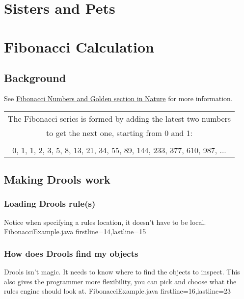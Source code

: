\chapter{Sisters and Pets}

\chapter{Fibonacci Calculation}
\section {Background}
See \href{http://www.mcs.surrey.ac.uk/Personal/R.Knott/Fibonacci/fibnat.html}{Fibonacci Numbers and Golden section in Nature} for more information.  
\\
\begin {tabular}{|c|}
\hline
The Fibonacci series is formed by adding the latest two numbers\\
to get the next one, starting from 0 and 1:\\
\\
0, 1, 1, 2, 3, 5, 8, 13, 21, 34, 55, 89, 144, 233, 377, 610, 987, ...\\ 
\hline
\end {tabular}

\section {Making Drools work}
\subsection {Loading Drools rule(s)}
Notice when specifying a rules location, it doesn't have to be local.  
 {FibonacciExample.java} {firstline=14,lastline=15}

\subsection {How does Drools find my objects}
Drools isn't magic.
It needs to know where to find the objects to inspect. 
This also gives the programmer more flexibility, you can pick and choose what the rules engine should look at. 
 {FibonacciExample.java} {firstline=16,lastline=23}

